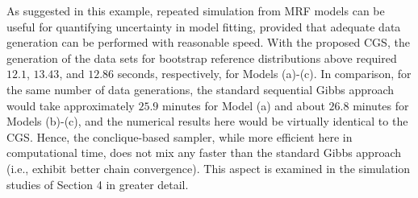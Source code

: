 \documentclass[12pt]{article}
\theoremstyle{definition}
\begin{document}
As suggested in this example, repeated simulation from MRF models can be useful for quantifying uncertainty in model fitting, provided that adequate data generation can be performed with reasonable speed. With the proposed CGS, the generation of the data sets for bootstrap reference distributions above required \(12.1\),
\(13.43\), and \(12.86\) seconds, respectively, for Models (a)-(c). In comparison, for the same number of data generations, the standard sequential Gibbs approach would take approximately \(25.9\) minutes for Model (a) and about \(26.8\) minutes for Models (b)-(c), and the numerical results here would be virtually identical to the CGS. Hence, the conclique-based sampler, while more efficient here in computational time, does not mix any faster than the standard Gibbs approach (i.e., exhibit better chain convergence). This aspect is examined in the simulation studies of Section 4 in greater detail.
\end{document}
